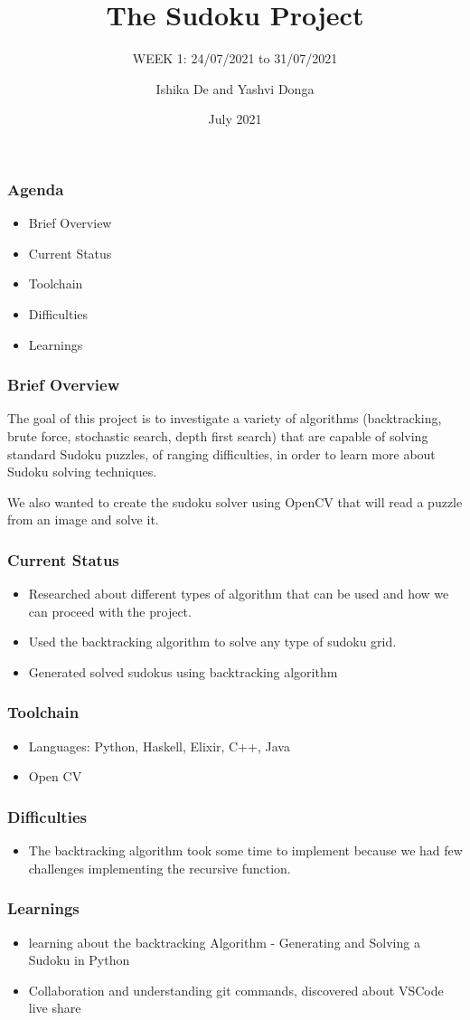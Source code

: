 \documentclass{beamer}
\title{The Sudoku Project}
\subtitle{WEEK 1: 24/07/2021 to 31/07/2021}
\author[Ishika | Yashvi]{Ishika De and Yashvi Donga}
\date{July 2021}
\begin{document}
\begin{frame}
     \titlepage
\end{frame}
\begin{frame}
     \frametitle{Agenda}
     \begin{itemize}
          \item Brief Overview
          \item Current Status
          \item Toolchain
          \item Difficulties
          \item Learnings
     \end{itemize}
\end{frame}

\begin{frame}
     \frametitle{Brief Overview}
     The goal of this project is to investigate a variety of algorithms (backtracking, brute force, stochastic search, depth first search) that are capable of solving
standard Sudoku puzzles, of ranging difficulties, in order to learn more about Sudoku
solving techniques.\newline

     We also wanted to create the sudoku solver using OpenCV that will read a puzzle from an image and solve it.
\end{frame}
\begin{frame}
     \frametitle{Current Status}   
     \begin{itemize}
          \item Researched about different types of algorithm that can be used and how we can proceed with the project.
          \item Used the backtracking algorithm to solve any type of sudoku grid.
          \item Generated solved sudokus using backtracking algorithm
     \end{itemize}
\end{frame}


\begin{frame}
     \frametitle{Toolchain}
     \begin{itemize}
          \item Languages: Python, Haskell, Elixir, C++, Java
          \item Open CV
     \end{itemize}
\end{frame}

\begin{frame}
     \frametitle{Difficulties}
     \begin{itemize}
          \item The backtracking algorithm took some time to implement because we had few challenges implementing the recursive function.
\end{itemize}
\end{frame}

\begin{frame}
     \frametitle{Learnings}
     \begin{itemize}
     \item learning about the backtracking Algorithm -  Generating and Solving a Sudoku in Python
     \item Collaboration and understanding git commands, discovered about VSCode live share
\end{itemize}         
\end{frame}
\end{document}
